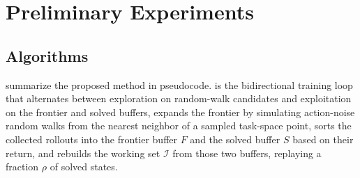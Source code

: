 \chapter{Preliminary Experiments}

\section{Algorithms}\label{sec:appendix_algorithms}

 summarize the proposed
method in pseudocode.  is the bidirectional training loop that
alternates between exploration on random-walk candidates and exploitation on the
frontier and solved buffers,  expands the frontier by simulating
action-noise random walks from the nearest neighbor of a sampled task-space point,
 sorts the collected rollouts into the frontier buffer $F$ and the
solved buffer $S$ based on their return, and  rebuilds the working set
$\mathcal{I}$ from those two buffers, replaying a fraction $\rho$ of solved states.








